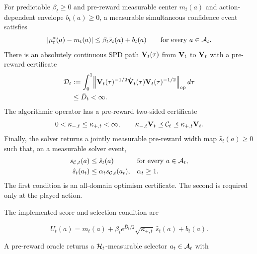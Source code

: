 \begin{assumption}
\label{asm:abstract-transport}
For predictable $\beta_t\ge0$ and pre-reward measurable center $m_t(a)$ and
action-dependent envelope $b_t(a)\ge0$, a measurable simultaneous confidence
event satisfies
\begin{equation}\label{eq:abstract-confidence-new}
 |\mu_t^*(a)-m_t(a)|\le\beta_t\bar s_t(a)+b_t(a)
 \qquad\text{for every }a\in\mathcal{A}_t.
\end{equation}
There is an absolutely continuous SPD path $\mathbf{V}_t(\tau)$ from
$\bar{\mathbf{V}}_t$ to $\mathbf{V}_t$ with a pre-reward certificate
\begin{equation}\label{eq:path-length-new}
 \begin{aligned}
  \mathcal D_t
  &:=\int_0^1\!\left\|
  \mathbf{V}_t(\tau)^{-1/2}\dot{\mathbf{V}}_t(\tau)\mathbf{V}_t(\tau)^{-1/2}
  \right\|_{\rm op}d\tau\\
  &\le\bar D_t<\infty.
 \end{aligned}
\end{equation}
The algorithmic operator has a pre-reward two-sided certificate
\begin{equation}\label{eq:operator-sandwich-new}
 0<\kappa_{-,t}\le\kappa_{+,t}<\infty,\qquad
 \kappa_{-,t}\mathbf{V}_t\preceq\mathcal{C}_t\preceq\kappa_{+,t}\mathbf{V}_t.
\end{equation}
Finally, the solver returns a jointly measurable pre-reward width map
$\hat s_t(a)\ge0$ such that, on a measurable solver event,
\begin{equation}\label{eq:solver-interface-new}
 \begin{aligned}
  s_{\mathcal{C},t}(a)&\le\hat s_t(a)
  &&\text{for every }a\in\mathcal{A}_t,\\
  \hat s_t(a_t)&\le\alpha_t s_{\mathcal{C},t}(a_t),
  &&\alpha_t\ge1.
 \end{aligned}
\end{equation}
The first condition is an all-domain optimism certificate.  The second is
required only at the played action.
\end{assumption}

The implemented score and selection condition are

\begin{equation}\label{eq:transported-score-new}
 U_t(a)=m_t(a)
 +\beta_t e^{\bar D_t/2}\sqrt{\kappa_{+,t}}\,\hat s_t(a)
 +b_t(a).
\end{equation}

A pre-reward oracle returns a $\mathcal{H}_t$-measurable selector $a_t\in\mathcal{A}_t$ with

